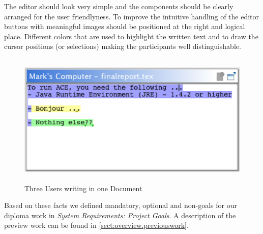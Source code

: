 The editor should look very simple and the components should be clearly arranged for the user friendlyness. To improve the intuitive handling of the editor buttons with meaningful images should be positioned at the right and logical place. Different colors that are used to highlight the written text and to draw the cursor positions (or selections) making the participants well distinguishable. \\

\begin{figure}[H]
\begin{center}
  \includegraphics[height=2.5in, width=5.12in]{../images/usermanual/editor_collab_3users.eps}
\caption{Three Users writing in one Document}
\end{center}
\end{figure}

Based on these facts we defined mandatory, optional and non-goals for our diploma work in \textit{System Requirements: Project Goals}. A description of the preview work can be found in \ref{sect:overview.previouswork}.
